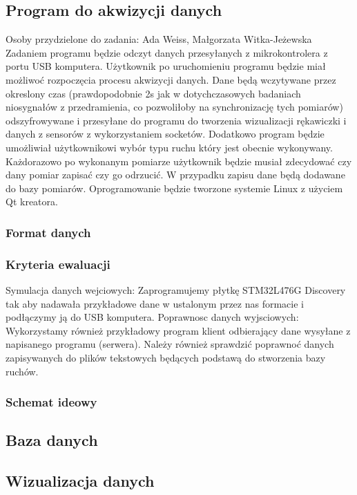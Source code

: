 \documentclass{article}
\begin{document}
\subsection{Program do akwizycji danych}
Osoby przydzielone do zadania: Ada Weiss, Małgorzata Witka-Jeżewska\\
Zadaniem programu będzie odczyt danych przesyłanych z mikrokontrolera z portu USB komputera. Użytkownik po uruchomieniu programu będzie miał możliwoć rozpoczęcia procesu akwizycji danych. Dane będą wczytywane przez okreslony czas (prawdopodobnie 2s jak w dotychczasowych badaniach niosygnałów z przedramienia, co pozwoliłoby na synchronizację tych pomiarów) odszyfrowywane i przesyłane do programu do tworzenia wizualizacji rękawiczki i danych z sensorów z wykorzystaniem socketów. Dodatkowo program będzie umożliwiał użytkownikowi wybór typu ruchu który jest obecnie wykonywany. Każdorazowo po wykonanym pomiarze użytkownik będzie musiał zdecydować czy dany pomiar zapisać czy go odrzucić. W przypadku zapisu dane będą dodawane do bazy pomiarów. Oprogramowanie będzie tworzone systemie Linux z użyciem Qt kreatora.
\subsubsection{Format danych}
\subsubsection{Kryteria ewaluacji}
Symulacja danych wejciowych: 
Zaprogramujemy płytkę STM32L476G Discovery tak aby nadawała przykładowe dane w ustalonym przez nas formacie i podłączymy ją do USB komputera.  
Poprawnosc danych wyjsciowych:
Wykorzystamy również przykładowy program klient odbierający dane wysyłane z napisanego programu (serwera). Należy również sprawdzić poprawnoć danych zapisywanych do plików tekstowych będących podstawą do stworzenia bazy ruchów.
\subsubsection{Schemat ideowy}

\subsection{Baza danych}
%
%
%
\subsection{Wizualizacja danych}
\end{document}
